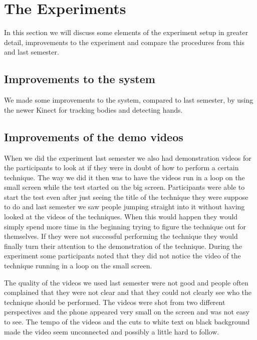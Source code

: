 \section*{The Experiments} \label{sec:experiments}
In this section we will discuss some elements of the experiment setup in greater detail, improvements to the experiment and compare the procedures from this and last semester.

\subsection*{Improvements to the system}\label{sec:systemImprovements}
We made some improvements to the system, compared to last semester, by using the newer Kinect for tracking bodies and detecting hands.

\subsection*{Improvements of the demo videos}\label{sec:videoslastsemester}
When we did the experiment last semester we also had demonstration videos for the participants to look at if they were in doubt of how to perform a certain technique.
The way we did it then was to have the videos run in a loop on the small screen while the test started on the big screen.
Participants were able to start the test even after just seeing the title of the technique they were suppose to do and last semester we saw people jumping straight into it without having looked at the videos of the techniques. 
When this would happen they would simply spend more time in the beginning trying to figure the technique out for themselves.
If they were not successful performing the technique they would finally turn their attention to the demonstration of the technique.
During the experiment some participants noted that they did not notice the video of the technique running in a loop on the small screen.

The quality of the videos we used last semester were not good and people often complained that they were not clear and that they could not clearly see who the technique should be performed.
The videos were shot from two different perspectives and the phone appeared very small on the screen and was not easy to see.
The tempo of the videos and the cuts to white text on black background made the video seem unconnected and possibly a little hard to follow.\\

